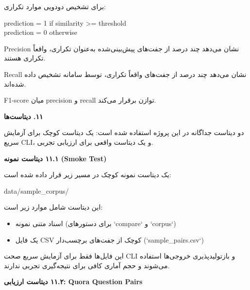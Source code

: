 \documentclass[11pt]{article}
\begin{document}
\noindent ‏برای تشخیص دودویی موارد تکراری:\par

{\mycode
\begin{flushleft}
prediction = 1 if similarity >= threshold \\
prediction = 0 otherwise
\end{flushleft}}

\noindent ‏Precision نشان می‌دهد چند درصد از جفت‌های پیش‌بینی‌شده به‌عنوان تکراری، واقعاً تکراری هستند.\par

\noindent ‏Recall نشان می‌دهد چند درصد از جفت‌های واقعاً تکراری، توسط سامانه تشخیص داده شده‌اند.\par

\noindent ‏F1-score میان precision و recall توازن برقرار می‌کند.\par

\medskip\noindent\hrulefill\medskip

\medskip
{\large\bfseries ‏۱۱. دیتاست‌ها}\medskip


\noindent ‏دو دیتاست جداگانه در این پروژه استفاده شده است: یک دیتاست کوچک برای آزمایش سریع CLI، و یک دیتاست واقعی برای ارزیابی تجربی.\par

\smallskip
{\bfseries ‏۱۱.۱ دیتاست نمونه (Smoke Test)}\smallskip


\noindent ‏یک دیتاست نمونه کوچک در مسیر زیر قرار داده شده است:\par

{\mycode
\begin{flushleft}
data/sample\_corpus/
\end{flushleft}}

\noindent ‏این دیتاست شامل موارد زیر است:\par

\begin{itemize}

\item ‏اسناد متنی نمونه (برای دستورهای `compare` و `corpus`)

\item ‏یک فایل CSV کوچک از جفت‌های برچسب‌دار (`sample\_pairs.csv`)

\end{itemize}

\noindent ‏این فایل‌ها فقط برای آزمایش سریع صحت CLI و بازتولیدپذیری خروجی‌ها استفاده می‌شوند و حجم آماری کافی برای نتیجه‌گیری تجربی ندارند.\par

\smallskip
{\bfseries ‏۱۱.۲ دیتاست ارزیابی: Quora Question Pairs}\smallskip
\end{document}
